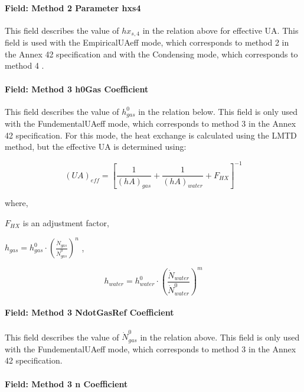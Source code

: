 \paragraph{Field: Method 2 Parameter hxs4}\label{field-method-2-parameter-hxs4}

This field describes the value of \(h{x_{s,4}}\) in the relation above for effective UA. This field is used with the EmpiricalUAeff mode, which corresponds to method 2 in the Annex 42 specification and with the Condensing mode, which corresponds to method 4 .

\paragraph{Field: Method 3 h0Gas Coefficient}\label{field-method-3-h0gas-coefficient}

This field describes the value of \(h_{gas}^0\) in the relation below. This field is only used with the FundementalUAeff mode, which corresponds to method 3 in the Annex 42 specification. For this mode, the heat exchange is calculated using the LMTD method, but the effective UA is determined using:

\begin{equation}
{\left( {UA} \right)_{eff}} = {\left[ {\frac{1}{{{{\left( {hA} \right)}_{gas}}}} + \frac{1}{{{{(hA)}_{water}}}} + {F_{HX}}} \right]^{ - 1}}
\end{equation}

where,

\({F_{HX}}\) is an adjustment factor,

\({h_{gas}} = h_{gas}^0 \cdot {\left( {\frac{{{{\dot N}_{gas}}}}{{\dot N_{gas}^0}}} \right)^n}\) ,

\begin{equation}
{h_{water}} = h_{water}^0 \cdot {\left( {\frac{{{{\dot N}_{water}}}}{{\dot N_{water}^0}}} \right)^m}
\end{equation}

\paragraph{Field: Method 3 NdotGasRef Coefficient}\label{field-method-3-ndotgasref-coefficient}

This field describes the value of \(\dot N_{gas}^0\) in the relation above. This field is only used with the FundementalUAeff mode, which corresponds to method 3 in the Annex 42 specification.

\paragraph{Field: Method 3 n Coefficient}\label{field-method-3-n-coefficient}

